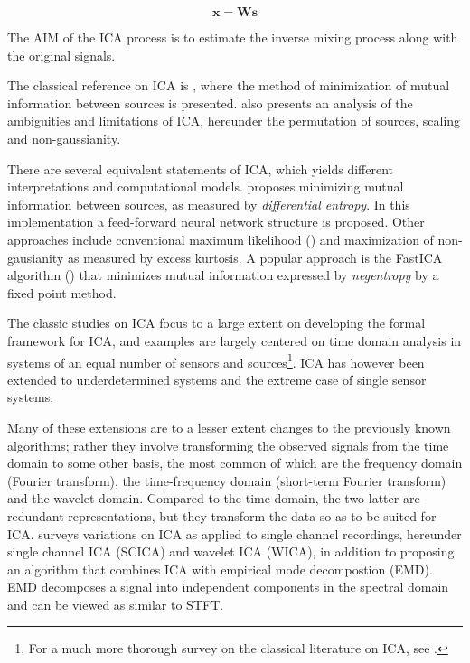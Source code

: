 \begin{equation}
  \mathbf{x} =   \mathbf{W}  \mathbf{s}
\end{equation}

The AIM of the ICA process is to estimate the inverse mixing process
along with the original signals.

The classical reference on ICA
is \cite{comon94}, where the method of minimization of mutual
information between sources is presented. \cite{comon94} also presents an
analysis of the ambiguities and limitations of ICA, hereunder the permutation of
sources, scaling and non-gaussianity. 

There are several equivalent statements of ICA, which yields different
interpretations and computational models.
\cite{bellSejnowski95} proposes minimizing mutual information between
sources, as measured by \emph{differential entropy}. In this
implementation a feed-forward neural network structure is proposed.
Other approaches include conventional maximum likelihood (\cite{pearlmutterParra}) and maximization of
non-gausianity as measured by excess kurtosis. A popular approach is
the  FastICA algorithm (\cite{fastICA}) that minimizes mutual
information expressed by \emph{negentropy} by a fixed point method. 

The classic studies on ICA focus to a large extent on developing the
formal framework for ICA, and examples are largely centered on time
domain analysis in systems of an equal number of sensors and
sources\footnote{For a much more thorough survey on the classical literature 
on ICA, see \cite{hyvarinen2001}.}. ICA has however been extended to underdetermined systems and
the extreme case of single sensor systems. 

Many of these extensions are to a lesser extent changes to the
previously known algorithms; rather they involve transforming
the observed signals from the time domain to some other basis, the
most common of which are the frequency domain (Fourier transform), the
time-frequency domain (short-term Fourier transform) and the wavelet
domain. Compared to the time domain, the two latter are redundant
representations, but they transform the data so as to be suited for
ICA. \cite{mijovic2010} surveys variations on ICA as applied to single
channel recordings, hereunder single channel ICA (SCICA) and wavelet
ICA (WICA), in addition to proposing an algorithm that combines ICA
with empirical mode decompostion (EMD). EMD decomposes a signal into
independent components in the spectral domain and can be viewed as
similar to STFT.

